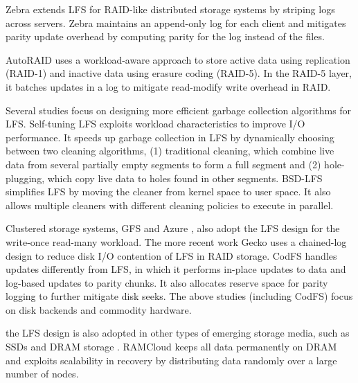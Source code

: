 Zebra \cite{hartman95} extends LFS for RAID-like distributed storage systems by
striping logs across servers. Zebra maintains an append-only log for each client
and mitigates parity update overhead by computing parity for the log instead of
the files. 

AutoRAID \cite{wilkes95} uses a workload-aware approach to store active data
using replication (RAID-1) and inactive data using erasure coding (RAID-5). In
the RAID-5 layer, it batches updates in a log to mitigate read-modify write
overhead in RAID.

Several studies focus on designing more efficient garbage collection algorithms
for LFS. Self-tuning LFS \cite{matthews97} exploits workload characteristics to
improve I/O performance. It speeds up garbage collection in LFS by dynamically
choosing between two cleaning algorithms, (1) traditional cleaning, which
combine live data from several partially empty segments to form a full segment
and (2) hole-plugging, which copy live data to holes found in other segments.
BSD-LFS \cite{seltzer93,seltzer95} simplifies LFS by moving the cleaner from
kernel space to user space. It also allows multiple cleaners with different
cleaning policies to execute in parallel.

Clustered storage systems, GFS \cite{ghemawat03} and Azure \cite{calder11}, also
adopt the LFS design for the write-once read-many workload.  The more recent
work Gecko \cite{shin13} uses a chained-log design to reduce disk I/O contention
of LFS in RAID storage.  CodFS handles updates differently from LFS, in which it
performs in-place updates to data and log-based updates to parity chunks.  It
also allocates reserve space for parity logging to further mitigate disk seeks.
The above studies (including CodFS) focus on disk backends and commodity
hardware. 

the LFS design is also adopted in other types of emerging storage media, such as
SSDs \cite{agrawal08} and DRAM storage \cite{ongaro11}.  RAMCloud keeps all data
permanently on DRAM and exploits scalability in recovery by distributing data
randomly over a large number of nodes.




